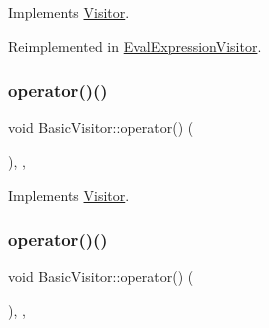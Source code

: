 Implements \hyperlink{struct_visitor_a6d707fe0c1563b39aae3ecd7ddb5ab8f}{Visitor}.



Reimplemented in \hyperlink{struct_eval_expression_visitor_a4eb471ad8286c264eb2af55aaf6c5a45}{Eval\+Expression\+Visitor}.

\mbox{\label{struct_basic_visitor_a1e22bd82234168dd70579eabe84574ad}} 
\subsubsection{\texorpdfstring{operator()()}{operator()()}\hspace{0.1cm}{\footnotesize\ttfamily [6/60]}}
{\footnotesize\ttfamily void Basic\+Visitor\+::operator() (\begin{DoxyParamCaption}\item[{const \hyperlink{struct_string_literal}{String\+Literal} \&}]{ }\end{DoxyParamCaption})\hspace{0.3cm}{\ttfamily [inline]}, {\ttfamily [override]}, {\ttfamily [virtual]}}



Implements \hyperlink{struct_visitor_a6bab8ba66edf0cc73cb92073269e7848}{Visitor}.

\mbox{\label{struct_basic_visitor_a40d181efc4db66a595baaee6e78c65db}} 
\subsubsection{\texorpdfstring{operator()()}{operator()()}\hspace{0.1cm}{\footnotesize\ttfamily [7/60]}}
{\footnotesize\ttfamily void Basic\+Visitor\+::operator() (\begin{DoxyParamCaption}\item[{const \hyperlink{struct_regular_expression_literal}{Regular\+Expression\+Literal} \&}]{ }\end{DoxyParamCaption})\hspace{0.3cm}{\ttfamily [inline]}, {\ttfamily [override]}, {\ttfamily [virtual]}}



